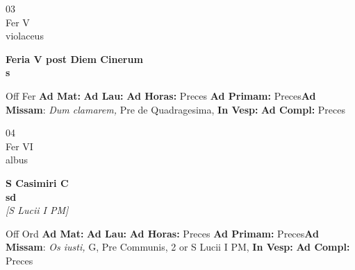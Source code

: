 \documentclass[10pt, openany]{book}
\begin{document}
    \begin{center}
        \begin{minipage}{3.5in}
            \vspace{2em}
            \begin{minipage}{0.5in}
                {\Huge 03} \\
                {\normalsize Fer V} \\
                {\normalsize violaceus}
            \end{minipage}
            \begin{minipage}{3.0in}
                \textbf{ \large Feria V post Diem Cinerum \\
                \textnormal{\normalsize s}} \\ 
            \end{minipage}
            \begin{justify}Off Fer
                \textbf{Ad Mat: }
                \textbf{Ad Lau: }
                \textbf{Ad Horas: }Preces
                \textbf{Ad Primam: }Preces\textbf{Ad Missam}: \textit{Dum clamarem,} Pre de Quadragesima,  
                \textbf{In Vesp: }
                \textbf{Ad Compl: }Preces
            \end{justify}
        \end{minipage}
    \end{center}

    \begin{center}
        \begin{minipage}{3.5in}
            \vspace{2em}
            \begin{minipage}{0.5in}
                {\Huge 04} \\
                {\normalsize Fer VI} \\
                {\normalsize albus}
            \end{minipage}
            \begin{minipage}{3.0in}
                \textbf{ \large S Casimiri C \\
                \textnormal{\normalsize sd}} \\ \textit{[S Lucii I PM]} \\ 
            \end{minipage}
            \begin{justify}Off Ord
                \textbf{Ad Mat: }
                \textbf{Ad Lau: }
                \textbf{Ad Horas: }Preces
                \textbf{Ad Primam: }Preces\textbf{Ad Missam}: \textit{Os iusti,} G, Pre Communis, 2 or S Lucii I PM,  
                \textbf{In Vesp: }
                \textbf{Ad Compl: }Preces
            \end{justify}
        \end{minipage}
    \end{center}
\end{document}
